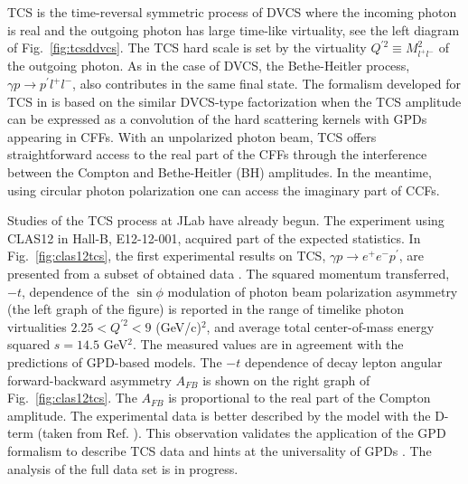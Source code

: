 TCS is the time-reversal symmetric process of DVCS where the incoming photon is real and the outgoing photon has large time-like virtuality, see the left diagram of Fig.~\ref{fig:tcsddvcs}. The TCS hard scale is set by the virtuality $Q^{\prime 2}\equiv M^2_{l^+l^-}$ of the outgoing photon. As in the case of DVCS, the Bethe-Heitler process, $\gamma p\to p^\prime l^+l^-$, also contributes in the same final state. The formalism developed for TCS in \cite{Berger:2002tc} is based on the similar DVCS-type factorization when the TCS amplitude can be expressed as a convolution of the hard scattering kernels with GPDs appearing in CFFs.  With an unpolarized photon beam, TCS offers straightforward access to the real part of the CFFs through the interference between the Compton and Bethe-Heitler (BH) amplitudes. In the meantime, using circular photon polarization one can access the imaginary part of CCFs. 

Studies of the TCS process at JLab have already begun. The experiment using CLAS12 in Hall-B, E12-12-001\cite{E12-12-001}, acquired part of the expected statistics. In Fig.~\ref{fig:clas12tcs}, the first experimental results on TCS, $\gamma p\to e^+e^- p^\prime$, are presented from a subset of obtained data \cite{clas12tcs}. The squared momentum transferred, $-t$, dependence of the $\sin{\phi}$ modulation of photon beam polarization asymmetry  (the left graph of the figure) is reported in the range of timelike photon virtualities $2.25 < Q^{\prime 2} < 9$ (GeV/c)$^2$, and average total center-of-mass energy squared $s = 14.5$ GeV$^2$. The measured values are in agreement with the predictions of GPD-based models.  The $-t$ dependence of decay lepton angular forward-backward asymmetry $A_{FB}$ is shown on the right graph of Fig.~\ref{fig:clas12tcs}. The $A_{FB}$ is proportional to the real part of the Compton amplitude. The experimental data is better described by the model with the D-term (taken from Ref. \cite{PASQUINI2014133}). This observation validates the application of the GPD formalism to describe TCS data and hints at the universality of GPDs \cite{Mueller:2012sma, Grocholski:2019pqj}. The analysis of the full data set is in progress.

